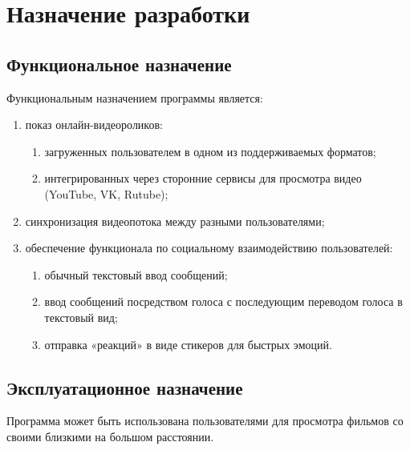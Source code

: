 \section{Назначение разработки}

\subsection{Функциональное назначение}

Функциональным назначением программы является:
\begin{enumerate}
    \item показ онлайн-видеороликов:
    \begin{enumerate}
        \item загруженных пользователем в одном из поддерживаемых форматов;
        \item интегрированных через сторонние сервисы для просмотра видео (YouTube, VK, Rutube);
    \end{enumerate}
    \item синхронизация видеопотока между разными пользователями;
    \item обеспечение функционала по социальному взаимодействию пользователей:
    \begin{enumerate}
        \item обычный текстовый ввод сообщений;
        \item ввод сообщений посредством голоса с последующим переводом голоса в текстовый вид;
        \item отправка «реакций» в виде стикеров для быстрых эмоций.
    \end{enumerate}
\end{enumerate}


\subsection{Эксплуатационное назначение}

Программа может быть использована пользователями для просмотра фильмов со своими близкими на большом расстоянии.